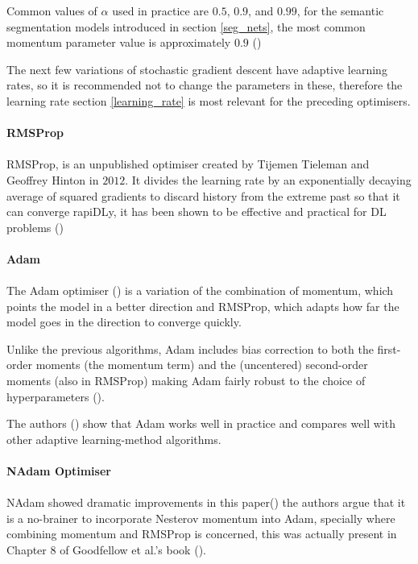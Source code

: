 Common values of $\alpha$ used in practice are $0.5$, $0.9$, and $0.99$, for the semantic segmentation models introduced in section \ref{seg_nets}, the most common momentum parameter value is approximately $0.9$ (\cite{sultana2020106062})

The next few variations of stochastic gradient descent have adaptive learning rates, so it is recommended not to change the parameters in these, therefore the learning rate section \ref{learning_rate} is most relevant for the preceding optimisers.
\paragraph{\gls{RMSProp}}
\paragraph{}
\gls{RMSProp}, is an unpublished optimiser created by Tijemen Tieleman and Geoffrey Hinton in $2012$. It divides the learning rate by an exponentially decaying average of squared gradients to discard history from the extreme past so that it can converge rapi\gls{DL}y, it has been shown to be effective and practical for \gls{DL} problems (\cite{GoodBengCour16})

\paragraph{\gls{Adam}}
\paragraph{}
The \gls{Adam} optimiser (\cite{kingma2017adam}) is a variation of the combination of momentum, which points the model in a better direction and \gls{RMSProp}, which adapts how far the model goes in the direction to converge quickly.

Unlike the previous algorithms, \gls{Adam} includes bias correction to both the ﬁrst-order moments (the momentum term) and the (uncentered) second-order moments (also in \gls{RMSProp}) making \gls{Adam} fairly robust to the choice of hyperparameters (\cite{GoodBengCour16}).

The authors (\cite{kingma2017adam}) show that \gls{Adam} works well in practice and compares well with other adaptive learning-method algorithms.
\paragraph{\gls{NAdam} Optimiser}
\paragraph{}
\gls{NAdam} showed dramatic improvements in this paper(\cite{nadam}) the authors argue that it is a no-brainer to incorporate Nesterov momentum into \gls{Adam}, specially where combining momentum and \gls{RMSProp} is concerned, this was actually present in Chapter 8 of Goodfellow et al.'s book (\cite{GoodBengCour16}).

